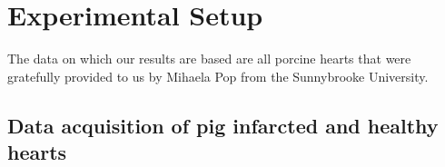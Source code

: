 
\chapter{Experimental Setup}

The data on which our results are based are all porcine hearts that were gratefully provided to us by Mihaela Pop from the Sunnybrooke University.

\section{Data acquisition of pig infarcted and healthy hearts}

